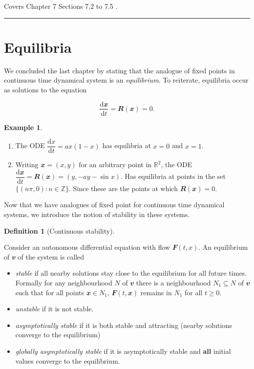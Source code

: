 \documentclass[
  a4paper,
  oneside,
  final]{krantz}
\providecommand{\tightlist}{%
  \setlength{\itemsep}{0pt}\setlength{\parskip}{0pt}}
\newcommand{\R}{\mathbb{R}}
\newcommand{\Z}{\mathbb{Z}}
\renewcommand{\d}{\mathrm{d}}
\renewcommand{\v}[1]{{\mathbfit{#1}}}
\newcommand{\der}[2]{\dfrac{\d #1}{\d #2}}
\theoremstyle{definition}
\newtheorem{definition}{Definition}[chapter]
\theoremstyle{definition}
\newtheorem{example}{Example}[chapter]
\theoremstyle{definition}
\theoremstyle{definition}
\theoremstyle{remark}
\begin{document}
Covers Chapter 7 Sections 7.2 to 7.5 \citep{ASY}.

\begin{center}\rule{0.5\linewidth}{0.5pt}\end{center}

\hypertarget{Equilibria}{%
\section{Equilibria}\label{Equilibria}}

We concluded the last chapter by stating that the analogue of fixed points in continuous time dynamical system is an \emph{equilibrium}. To reiterate, equilibria occur as solutions to the equation

\[ \der{\v{x}}{t} = \v{R}(\v{x}) = 0. \]

\begin{example}

\begin{enumerate}
\def\labelenumi{\arabic{enumi}.}
\tightlist
\item
  The ODE \(\der{x}{t} = ax(1-x)\) has equilibria at \(x = 0\) and \(x =1\).
\item
  Writing \(\v{x}=(x,y)\) for an arbitrary point in \(\R^2\), the ODE \(\der{\v{x}}{t} = \v{R}(\v{x}) = (y, -ay - \sin x)\). Has equilibria at points in the set \(\{ (n \pi, 0) : n \in \Z \}\). Since these are the points at which \(\v{R}(\v{x}) = 0\).
\end{enumerate}

\end{example}

Now that we have analogues of fixed point for continuous time dynamical systems, we introduce the notion of stability in these systems.

\begin{definition}[Continuous stability]
\protect\hypertarget{def:continuousstability}{}\label{def:continuousstability}

Consider an autonomous differential equation with flow \(\v{F}(t,x)\). An equilibrium of \(\v{v}\) of the system is called

\begin{itemize}
\tightlist
\item
  \emph{stable} if all nearby solutions stay close to the equilibrium for all future times. Formally for any neighbourhood \(N\) of \(\v{v}\) there is a neighbourhood \(N_1 \subseteq N\) of \(\v{v}\) such that for all points \(\v{x} \in N_1\), \(\v{F}(t, \v{x})\) remains in \(N_1\) for all \(t \ge 0\).
\item
  \emph{unstable} if it is not stable.
\item
  \emph{asymptotically stable} if it is both stable and attracting (nearby solutions converge to the equilibrium)
\item
  \emph{globally asymptotically stable} if it is asymptotically stable and \textbf{all} initial values converge to the equilibrium.
\end{itemize}

\end{definition}
\end{document}
